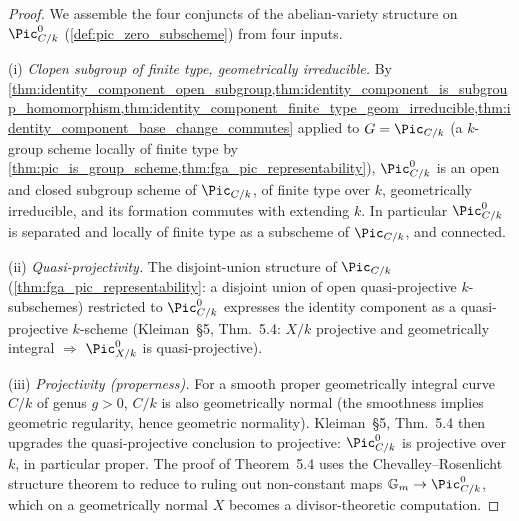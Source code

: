 \begin{proof}\leanok
  We assemble the four conjuncts of the abelian-variety structure on
  \(\Pic^0_{C/k}\) (\cref{def:pic_zero_subscheme}) from four inputs.

  (i) \emph{Clopen subgroup of finite type, geometrically irreducible.}
  By
  \cref{thm:identity_component_open_subgroup,thm:identity_component_is_subgroup_homomorphism,thm:identity_component_finite_type_geom_irreducible,thm:identity_component_base_change_commutes}
  applied to \(G = \Pic_{C/k}\) (a \(k\)-group scheme locally of finite
  type by
  \cref{thm:pic_is_group_scheme,thm:fga_pic_representability}),
  \(\Pic^0_{C/k}\) is an open and closed subgroup scheme of \(\Pic_{C/k}\),
  of finite type over \(k\), geometrically irreducible, and its
  formation commutes with extending \(k\). In particular \(\Pic^0_{C/k}\)
  is separated and locally of finite type as a subscheme of
  \(\Pic_{C/k}\), and connected.

  (ii) \emph{Quasi-projectivity.} The disjoint-union structure of
  \(\Pic_{C/k}\) (\cref{thm:fga_pic_representability}: a disjoint union
  of open quasi-projective \(k\)-subschemes) restricted to \(\Pic^0_{C/k}\)
  expresses the identity component as a quasi-projective \(k\)-scheme
  (Kleiman~\S 5, Thm.~5.4: \(X/k\) projective and geometrically
  integral \(\Longrightarrow\) \(\Pic^0_{X/k}\) is quasi-projective).

  (iii) \emph{Projectivity (properness).} For a smooth proper
  geometrically integral curve \(C/k\) of genus \(g > 0\), \(C/k\) is
  also geometrically normal (the smoothness implies geometric
  regularity, hence geometric normality). Kleiman~\S 5, Thm.~5.4
  then upgrades the quasi-projective conclusion to projective:
  \(\Pic^0_{C/k}\) is projective over \(k\), in particular proper.
  The proof of Theorem~5.4 uses the Chevalley--Rosenlicht structure
  theorem to reduce to ruling out non-constant maps
  \(\mathbb G_m \to \Pic^0_{C/k}\), which on a geometrically normal
  \(X\) becomes a divisor-theoretic computation.


\end{proof}
